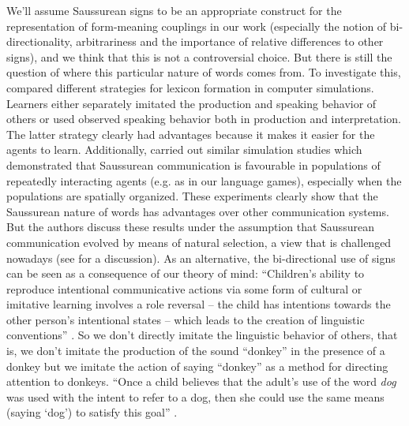 We'll assume Saussurean signs to be an appropriate construct for the
representation of form-meaning couplings in our work (especially the
notion of bi-directionality, arbitrariness and the importance of
relative differences to other signs), and we think that this is not a
controversial choice. But there is still the question of where this
particular nature of words comes from. To investigate this,
\cite{hurford89biological} compared different strategies for lexicon
formation in computer simulations. Learners either separately imitated
the production and speaking behavior of others or used observed
speaking behavior both in production and interpretation. The latter
strategy clearly had advantages because it makes it easier for the
agents to learn. Additionally, \cite{oliphant96dilemma} carried out
similar simulation studies which demonstrated that Saussurean
communication is favourable in populations of repeatedly interacting
agents (e.g. as in our language games), especially when the
populations are spatially organized. These experiments clearly show
that the Saussurean nature of words has advantages over other
communication systems. But the authors discuss these results under the
assumption that Saussurean communication evolved by means of natural
selection, a view that is challenged nowadays (see
\citealp[pp. 74--78]{bloom00how-children} for a discussion). As an
alternative, the bi-directional use of signs can be seen as a
consequence of our theory of mind: ``Children's ability to reproduce
intentional communicative actions via some form of cultural or
imitative learning involves a role reversal -- the child has
intentions towards the other person's intentional states -- which
leads to the creation of linguistic conventions''
\citep[p. 153]{tomasello01perceiving}. So we don't directly imitate
the linguistic behavior of others, that is, we don't imitate the
production of the sound ``donkey'' in the presence of a donkey but we
imitate the action of saying ``donkey'' as a method for directing
attention to donkeys. ``Once a child believes that the adult's use of
the word \emph{dog} was used with the intent to refer to a dog, then
she could use the same means (saying `dog') to satisfy this goal''
\citep[p. 76]{bloom00how-children}.

